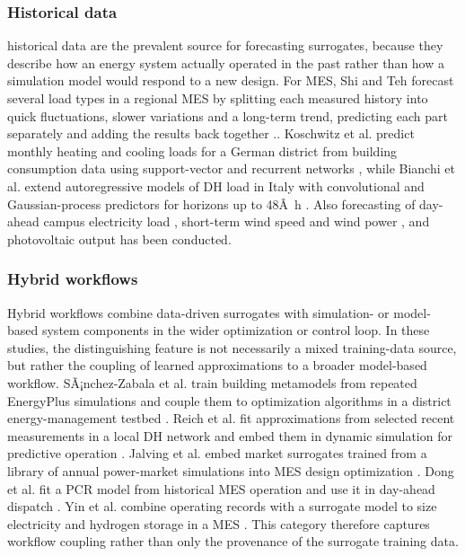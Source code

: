 \documentclass[final,5p,times,twocolumn]{elsarticle}
\begin{document}
\subsubsection{Historical data}

historical data are the prevalent source for forecasting surrogates,
because they describe how an energy system actually operated in the past
rather than how a simulation model would respond to a new design. For
MES, Shi and Teh forecast several load types in a regional MES by
splitting each measured history into quick fluctuations, slower
variations and a long-term trend, predicting each part separately and
adding the results back together \cite{Shi2024__2}.\cite{Dong2024}. Koschwitz et
al. predict monthly heating and cooling loads for a German district from
building consumption data using support-vector and recurrent networks
\cite{Koschwitz2018134}, while Bianchi et al. extend autoregressive models
of DH load in Italy with convolutional and Gaussian-process predictors
for horizons up to 48Â~h \cite{Bianchi2020244}. Also forecasting of day-ahead
campus electricity load \cite{Madhukumar20228891}, short-term wind speed and
wind power \cite{Tian2020,Hanifi2024}, and photovoltaic output \cite{Li2019}
has been conducted.

\subsubsection{Hybrid workflows}

Hybrid workflows combine data-driven surrogates with simulation- or
model-based system components in the wider optimization or control
loop. In these studies, the distinguishing feature is not necessarily a
mixed training-data source, but rather the coupling of learned
approximations to a broader model-based workflow. SÃ¡nchez-Zabala et
al. train building metamodels from repeated EnergyPlus simulations and
couple them to optimization algorithms in a district energy-management
testbed \cite{Sánchez-Zabala2024}. Reich et al. fit approximations from selected
recent measurements in a local DH network and embed them in dynamic
simulation for predictive operation \cite{Reich2020}. Jalving et al. embed
market surrogates trained from a library of annual power-market
simulations into MES design optimization \cite{Jalving2023}. Dong et al.
fit a PCR model from historical MES operation and use it in day-ahead
dispatch \cite{Dong2023}. Yin et al. combine operating records with a
surrogate model to size electricity and hydrogen storage in a MES
\cite{Yin2024}. This category therefore captures workflow coupling rather
than only the provenance of the surrogate training data.
\end{document}
